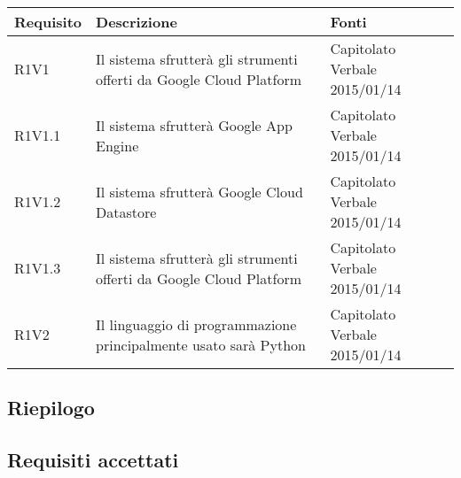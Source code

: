 \begin{center}

	\def\arraystretch{1.5}
	\bgroup
	\begin{longtable}{| p{2cm} | p{7cm} | p{2cm} |}

		\hline
		\textbf{Requisito} & \textbf{Descrizione} & \textbf{Fonti} \\
		\hline

		R1V1  &  Il sistema sfrutterà gli strumenti offerti da Google Cloud Platform  &  Capitolato \newline Verbale 2015/01/14 \\
		\hline
		R1V1.1  &  Il sistema sfrutterà Google App Engine  &  Capitolato \newline Verbale 2015/01/14 \\
		\hline
		R1V1.2  &  Il sistema sfrutterà Google Cloud Datastore  &  Capitolato \newline Verbale 2015/01/14 \\
		\hline
		R1V1.3  &  Il sistema sfrutterà gli strumenti offerti da Google Cloud Platform  &  Capitolato \newline Verbale 2015/01/14 \\
		\hline
		R1V2  &  Il linguaggio di programmazione principalmente usato sarà Python  &  Capitolato \newline Verbale 2015/01/14 \\
		\hline

	\end{longtable}
	\egroup
\end{center}

\subsection{Riepilogo}

\subsection{Requisiti accettati}
